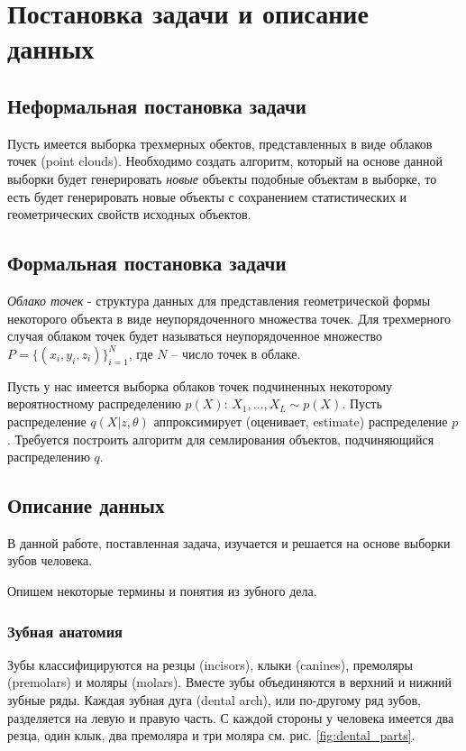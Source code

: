 \section{Постановка задачи и описание данных} \label{section:task}

\subsection{Неформальная постановка задачи}
Пусть имеется выборка трехмерных обектов, представленных в виде облаков точек (point clouds). Необходимо создать алгоритм, который на основе данной выборки будет генерировать \textit{новые} объекты подобные объектам в выборке, то есть будет генерировать новые объекты с сохранением статистических и геометрических свойств исходных объектов.

\subsection{Формальная постановка задачи}


\textit{Облако точек} - структура данных для представления геометрической формы некоторого объекта в виде неупорядоченного множества точек. Для трехмерного случая облаком точек будет называться неупорядоченное множество 
$P = \{(x_{i}, y_{i}, z_{i})\}_{i=1}^{N}$, где $N$ -- число точек в облаке.

Пусть у нас имеется выборка облаков точек подчиненных некоторому вероятностному распределению $p(X)$: $X_{1}, \ldots, X_{L} \sim p(X)$. Пусть распределение $q(X|z, \theta)$ аппроксимирует (оценивает, estimate) распределение $p$. Требуется построить алгоритм для семлирования объектов, подчиняющийся распределению $q$.

\subsection{Описание данных}

В данной работе, поставленная задача, изучается и решается на основе выборки зубов человека.

Опишем некоторые термины и понятия из зубного дела.

\subsubsection{Зубная анатомия}

Зубы классифицируются на резцы (incisors), клыки (canines), премоляры (premolars) и моляры (molars). Вместе зубы объединяются в верхний и нижний зубные ряды. Каждая зубная дуга (dental arch), или по-другому ряд зубов, разделяется на левую и правую часть. С каждой стороны у человека имеется два резца, один клык, два премоляра и три моляра \cite{kumar} см. рис. \ref{fig:dental_parts}.

